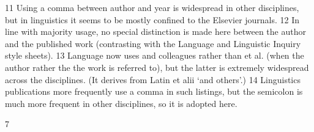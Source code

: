  	
 	
 	
 	
 	
 	
 	
 	
 	
 	
 	
 	
 	
 	
 	
 	
 	
 	
 	
 	
 	
 	
 	
 	
 	
 	
 	
 	
 	
 	
 	
 	
 	
 	
 	
 	
 	
 	
 	
 	
 	
 	
 	
 	
 	
 	
 	
 	
 	
 	
 	
 	
 	
 	
	
 
11
Using a comma between author and year is widespread in other disciplines, but in linguistics it seems to be
mostly confined to the Elsevier journals.
12
In line with majority usage, no special distinction is made here between the author and the published work
(contrasting with the Language and Linguistic Inquiry style sheets).
13
Language now uses and colleagues rather than et al. (when the author rather the the work is referred to), but
the latter is extremely widespread across the disciplines. (It derives from Latin et alii ‘and others’.)
14
Linguistics publications more frequently use a comma in such listings, but the semicolon is much more
frequent in other disciplines, so it is adopted here.
	
 
 7	
  

